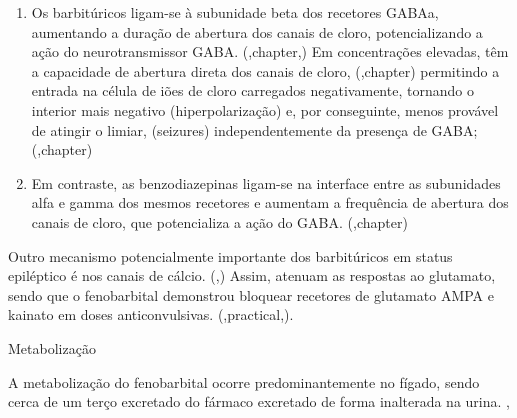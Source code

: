  \begin{enumerate}
    \item	Os barbitúricos ligam-se à subunidade beta dos recetores GABAa, aumentando a duração de abertura dos canais de cloro, potencializando a ação do neurotransmissor GABA. (\cite{Trinka2023},chapter,\cite{Bersan2014}) Em concentrações elevadas, têm a capacidade de abertura direta dos canais de cloro, (\cite{Trinka2023},chapter) permitindo a entrada na célula de iões de cloro carregados negativamente, tornando o interior mais negativo (hiperpolarização) e, por conseguinte, menos provável de atingir o limiar, (seizures) independentemente da presença de GABA; (\cite{Trinka2023},chapter)
    \item Em contraste, as benzodiazepinas ligam-se na interface entre as subunidades alfa e gamma dos mesmos recetores e aumentam a frequência de abertura dos canais de cloro, que potencializa a ação do GABA. (\cite{Trinka2023},chapter)
\end{enumerate}

Outro mecanismo potencialmente importante dos barbitúricos em status epiléptico é nos canais de cálcio. (\cite{Trinka2023},\cite{Bersan2014}) Assim, atenuam as respostas ao glutamato, sendo que o fenobarbital demonstrou bloquear recetores de glutamato AMPA e kainato em doses anticonvulsivas. (\cite{Loscher2012},practical,\cite{Bersan2014}).


Metabolização


A metabolização do fenobarbital ocorre predominantemente no fígado, sendo cerca de um terço excretado do fármaco excretado de forma inalterada na urina. \cite{Trinka2023},\cite{Podell2016}


